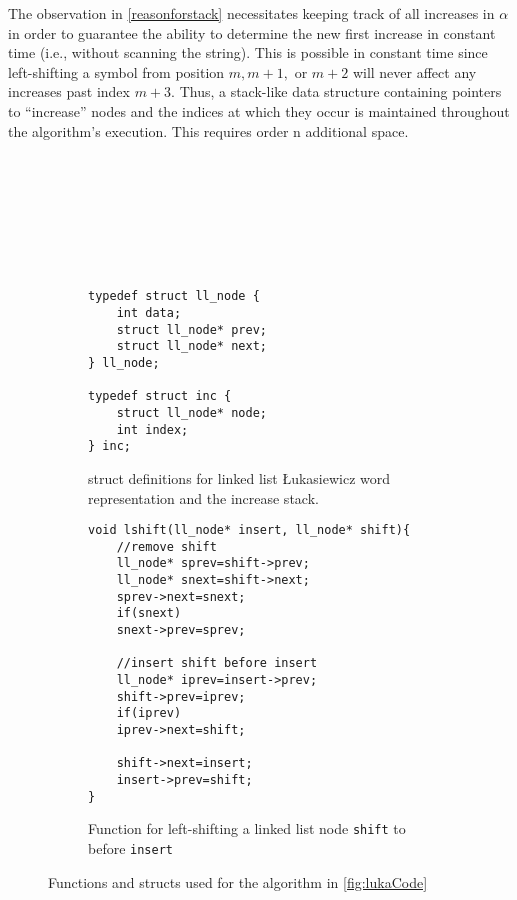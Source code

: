 The observation in \ref{reasonforstack} necessitates keeping track of all increases in $\alpha$ in order to guarantee the ability to determine the new first increase in constant time (i.e., without scanning the string).  This is possible in constant time since left-shifting a symbol from position $m,m+1,$ or $m+2$ will never affect any increases past index $m+3$.  Thus, a stack-like data structure containing pointers to ``increase'' nodes and the indices at which they occur is maintained throughout the algorithm's execution.  This requires order n additional space.

    
\begin{figure}[H]
    \begin{subfigure}[]{.5\textwidth}
    \begin{center}
        \begin{Verbatim}








typedef struct ll_node {
    int data;
    struct ll_node* prev;
    struct ll_node* next;
} ll_node;

typedef struct inc {
    struct ll_node* node;
    int index;
} inc;
        \end{Verbatim}
            
    \end{center}

    \caption{struct definitions for linked list Łukasiewicz word representation and the increase stack.}
    \label{fig:lukaStruct}
    \end{subfigure}
    \begin{subfigure}[]{.5\textwidth}
    \begin{center}
        \begin{Verbatim}
void lshift(ll_node* insert, ll_node* shift){
    //remove shift
    ll_node* sprev=shift->prev;
    ll_node* snext=shift->next;
    sprev->next=snext;
    if(snext)
	snext->prev=sprev;

    //insert shift before insert
    ll_node* iprev=insert->prev;
    shift->prev=iprev;
    if(iprev)
	iprev->next=shift;

    shift->next=insert;
    insert->prev=shift;
}
        \end{Verbatim}
    \end{center}

\cprotect\caption{Function for left-shifting a linked list node \verb$shift$ to before \verb$insert$}
    \label{fig:lukaHelpers}
    \end{subfigure}

    \caption{Functions and structs used for the algorithm in \ref{fig:lukaCode}}

\end{figure}

